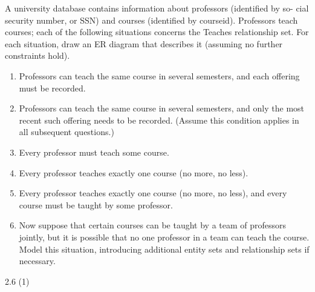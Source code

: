 \begin{problem}{2.2}

  A university database contains information about professors (identified by so- cial security number, or SSN) and
  courses (identified by courseid). Professors teach courses; each of the following situations concerns the Teaches
  relationship set. For each situation, draw an ER diagram that describes it (assuming no further constraints hold).

  \begin{enumerate}
    \item Professors can teach the same course in several semesters, and each offering must be recorded.
    \item Professors can teach the same course in several semesters, and only the most recent such offering needs to be
      recorded. (Assume this condition applies in all subsequent questions.)
    \item Every professor must teach some course.
    \item Every professor teaches exactly one course (no more, no less).
    \item Every professor teaches exactly one course (no more, no less), and every course must be taught by some professor.
    \item Now suppose that certain courses can be taught by a team of professors jointly, but it is possible that no one
      professor in a team can teach the course. Model this situation, introducing additional entity sets and relationship
      sets if necessary.
  \end{enumerate}

  \begin{solution}
  \end{solution}
\end{problem}
\begin{problem}{2.4}
  \begin{solution}
  \end{solution}
\end{problem}
\begin{problem}{2.6 (1)}
  \begin{solution}
  \end{solution}
\end{problem}
\begin{problem}{2.8}
  \begin{solution}
  \end{solution}
\end{problem}



